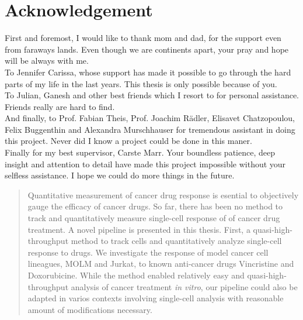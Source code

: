 \documentclass[pdftex,12pt,a4paper]{report}
\begin{document}
\chapter*{Acknowledgement}

First and foremost, I would like to thank mom and dad, for the support even from faraways lands. Even though we are continents apart, your pray and hope will be always with me.\\

To Jennifer Carissa, whose support has made it possible to go through the hard parts of my life in the last years. This thesis is only possible because of you.\\

To Julian, Ganesh and other best friends which I resort to for personal assistance. Friends really are hard to find.\\

And finally, to Prof. Fabian Theis, Prof. Joachim R\"adler, Elisavet Chatzopoulou, Felix Buggenthin and Alexandra Murschhauser for tremendous assistant in doing this project. Never did I know a project could be done in this maner.\\

Finally for my best supervisor, Carste Marr. Your boundless patience, deep insight and attention to detail have made this project impossible without your selfless assistance. I hope we could do more things in the future. 

\newpage

\begin{abstract}
Quantitative measurement of cancer drug response is esential to objectively gauge the efficacy of cancer drugs. So far, there has been no method to track and  quantitatively measure single-cell response of of cancer drug treatment. A novel pipeline is presented in this thesis. First, a quasi-high-throughput method to track cells and quantitatively analyze single-cell response to drugs. We investigate the response of model cancer cell lineagues, MOLM and Jurkat, to known anti-cancer drugs Vincristine and Doxorubicine. While the method enabled relatively easy and quasi-high-throughput analysis of cancer treatment \textit{in vitro}, our pipeline could also be adapted in varios contexts involving single-cell analysis with reasonable amount of modifications necessary.
\end{abstract}

\newpage

\tableofcontents

\newpage
\end{document}
